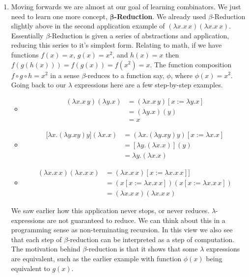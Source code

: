 \documentclass[12pt]{article}
\begin{document}
\begin{enumerate}
\item Moving forwards we are almost at our goal of learning combinators. We just need to learn one more concept, $\boldsymbol{\beta}$\textbf{-Reduction}. We already used $\beta$-Reduction slightly above in the second application example of $(\lambda x.x\,x) (\lambda x.x\,x)$. Essentially $\beta$-Reduction is given a series of abstractions and application, reducing this series to it's simplest form. Relating to math, if we have functions $f(x) = x$, $g(x) = x^2$, and $h(x) = x$ then $f(g(h(x))) = f(g(x)) = f(x^2) = x$. The function composition $f\circ g \circ h = x^2$ in a sense $\beta$-reduces to a function say, $\phi$, where $\phi(x) = x^2$. Going back to our $\lambda$ expressions here are a few step-by-step examples.
\begin{itemize}
\item 
	\begin{align*}
	(\lambda x. x\,y)(\lambda y.x) &= (\lambda 		x. x\,y)[x:=\lambda y.x]\\
 	&= (\lambda y.x)(y)\\
 	&= x
	\end{align*}
\item 
	\begin{align*}
	\big[\lambda x. (\lambda y. x y) y\big]			(\lambda x.x) &= (\lambda x. (\lambda y. x 		y) y)[x:= \lambda x.x]\\
 	&= [\lambda y.(\lambda x.x)](y)\\
 	&= \lambda y. (\lambda x.x)
\end{align*}
\item \begin{align*}
	(\lambda x.x\,x) (\lambda x.x\,x) &= 			(\lambda x.x\,x)[x:=\lambda x.x\,x]]\\
	&= (x[x:= \lambda x.x\,x])(x[x:=\lambda 			x.x\,x]) \\
 	&= (\lambda x.x\,x)(\lambda x.x\,x)
	\end{align*}
\end{itemize}
We saw earlier how this application never stops, or never reduces. $\lambda$-expressions are not guaranteed to reduce. We can think about this in a programming sense as non-terminating recursion. In this view we also see that each step of $\beta$-reduction can be interpreted as a step of computation. The motivation behind $\beta$-reduction is that it shows that some $\lambda$ expressions are equivalent, such as the earlier example with function $\phi(x)$ being equivalent to $g(x)$.


\end{enumerate}
\end{document}

